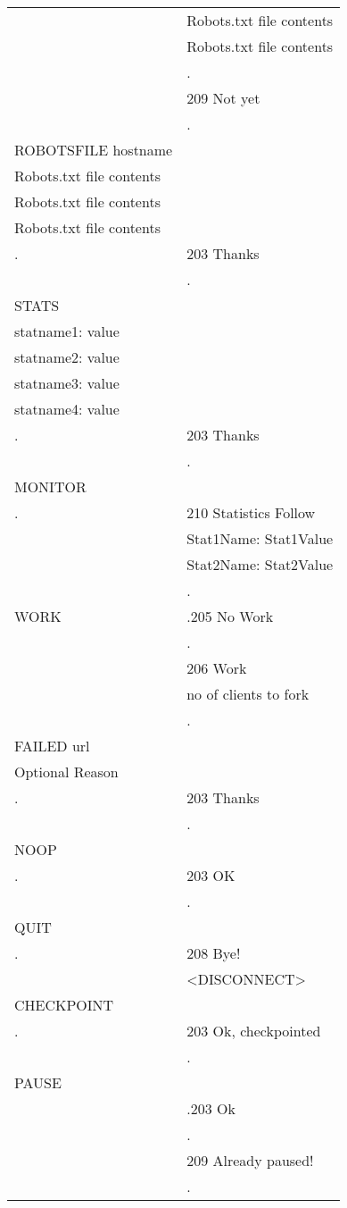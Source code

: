 \begin{center}
\begin{supertabular}{|l|l|}
&Robots.txt file contents\\
&Robots.txt file contents\\
&.\\
&209 Not yet\\
&.\\
\hline
ROBOTSFILE hostname&\\
Robots.txt file contents&\\
Robots.txt file contents&\\
Robots.txt file contents&\\
.&203 Thanks\\
&.\\
\hline
STATS & \\
statname1: value &\\
statname2: value &\\
statname3: value &\\
statname4: value &\\
.&203 Thanks\\
&.\\
\hline
MONITOR &\\
.&210 Statistics Follow \\
&Stat1Name: Stat1Value \\
&Stat2Name: Stat2Value\\
&.\\
\hline
WORK
&.205 No Work\\
&.\\
&206 Work\\
&no of clients to fork\\
&.\\
\hline
FAILED url&\\
Optional Reason&\\
.&203 Thanks\\
&.\\
\hline
NOOP&\\
.&203 OK\\
&.\\
\hline
QUIT&\\
.&208 Bye!\\
&<DISCONNECT>\\
\hline
CHECKPOINT&\\
.&203 Ok, checkpointed\\
&.\\
\hline
PAUSE&\\
&.203 Ok\\
&.\\
&209 Already paused!\\
&.\\

\end{supertabular}
\end{center}
